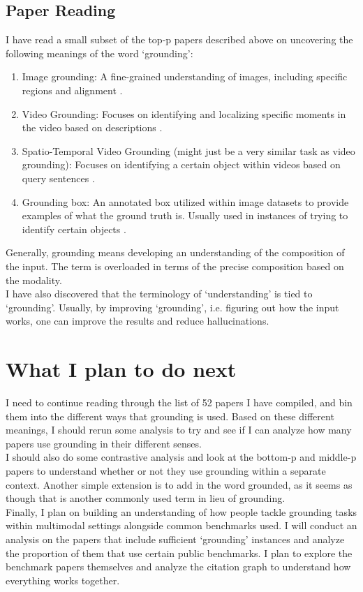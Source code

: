 \documentclass[12pt, letterpaper]{article}
\begin{document}
\subsection{Paper Reading}
I have read a small subset of the top-p papers described above on uncovering the following meanings of the word `grounding':
\begin{enumerate}
    \item Image grounding: A fine-grained understanding of images, including specific regions and alignment \cite{zhang2023llavagroundinggroundedvisualchat,li-etal-2024-groundinggpt}.
    \item Video Grounding: Focuses on identifying and localizing specific moments in the video based on descriptions \cite{li-etal-2024-groundinggpt}.
    \item Spatio-Temporal Video Grounding (might just be a very similar task as video grounding): Focuses on identifying a certain object within videos based on query sentences \cite{wasim2024videogroundingdinoopenvocabularyspatiotemporalvideo}.
    \item Grounding box: An annotated box utilized within image datasets to provide examples of what the ground truth is. Usually used in instances of trying to identify certain objects \cite{li-etal-2024-groundinggpt}.
\end{enumerate}
Generally, grounding means developing an understanding of the composition of the input. The term is overloaded in terms of the precise composition based on the modality.\\

I have also discovered that the terminology of `understanding' is tied to `grounding'. Usually, by improving `grounding', i.e. figuring out how the input works, one can improve the results and reduce hallucinations.

\section{What I plan to do next}
I need to continue reading through the list of 52 papers I have compiled, and bin them into the different ways that grounding is used. Based on these different meanings, I should rerun some analysis to try and see if I can analyze how many papers use grounding in their different senses.\\

I should also do some contrastive analysis and look at the bottom-p and middle-p papers to understand whether or not they use grounding within a separate context. Another simple extension is to add in the word grounded, as it seems as though that is another commonly used term in lieu of grounding.\\

Finally, I plan on building an understanding of how people tackle grounding tasks within multimodal settings alongside common benchmarks used. I will conduct an analysis on the papers that include sufficient `grounding' instances and analyze the proportion of them that use certain public benchmarks. I plan to explore the benchmark papers themselves and analyze the citation graph to understand how everything works together.



\end{document}

